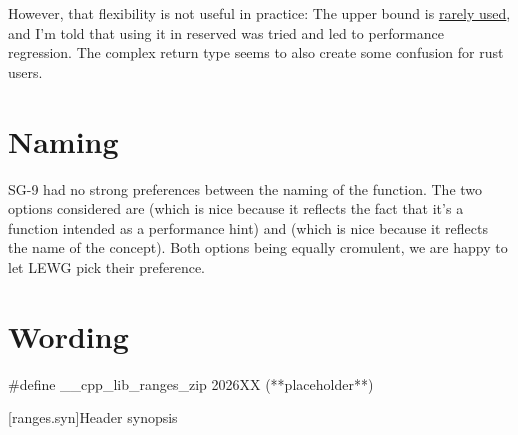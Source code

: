 \documentclass{wg21}
\begin{document}
However, that flexibility is not useful in practice:
The upper bound is \href{https://internals.rust-lang.org/t/is-size-hint-1-ever-used/8187?u=scottmcm}{rarely used},
and I'm told that using it in reserved was tried and led to performance regression.
The complex return type seems to also create some confusion for rust users.


\section{Naming}

SG-9 had no strong preferences between the naming of the  function.
The two options considered are  (which is nice because it reflects the fact that it's a function intended as a performance hint)
and  (which is nice because it reflects the name of the  concept).
Both options being equally cromulent, we are happy to let LEWG pick their preference.

\section{Wording}

\begin{addedblock}
\begin{codeblock}
    #define __cpp_lib_ranges_zip 2026XX (**placeholder**)
\end{codeblock}
\end{addedblock}

[ranges.syn]{Header  synopsis}
\end{document}
